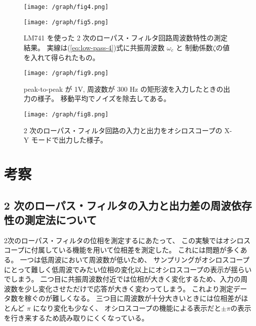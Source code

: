 \documentclass[11pt,dvipdfmx,a4paper]{jsarticle}
\begin{document}
\begin{figure}[H]
	\centering
	\begin{minipage}[t]{0.49\columnwidth}
		\centering
		\texttt{[image: /graph/fig4.png]}
		\label{graph:no4}
	\end{minipage}
	\hfill
	\begin{minipage}[t]{0.49\columnwidth}
		\centering
		\texttt{[image: /graph/fig5.png]}
		\label{graph:no5}
	\end{minipage}
	\caption{LM741 を使った 2 次のローパス・フィルタ回路周波数特性の測定結果。
	実線は(\ref{eq:low-pass-4})式に共振周波数 \(\omega_c\) と 制動係数\(\zeta\)の値を入れて得られたもの。}
\end{figure}

\begin{figure}[H]
	\centering
	\begin{minipage}[t]{0.55\columnwidth}
		\centering
		\texttt{[image: /graph/fig9.png]}
		\caption{peak-to-peak が 1V, 周波数が 300 Hz の矩形波を入力したときの出力の様子。
		移動平均でノイズを除去してある。}
		\label{graph:no9}
	\end{minipage}
	\hfill
	\begin{minipage}[t]{0.42\columnwidth}
		\centering
		\texttt{[image: /graph/fig8.png]}
		\caption{2 次のローパス・フィルタ回路の入力と出力をオシロスコープの X-Y モードで出力した様子。}
		\label{graph:no8}
	\end{minipage}
\end{figure}

\section{考察}
\subsection{2 次のローパス・フィルタの入力と出力差の周波依存性の測定法について}
2次のローパス・フィルタの位相を測定するにあたって、
この実験ではオシロスコープに付属している機能を用いて位相差を測定した。
これには問題が多くある。
一つは低周波において周波数が低いため、
サンプリングがオシロスコープにとって難しく低周波でみたい位相の変化以上にオシロスコープの表示が揺らいでしまう。
二つ目に共振周波数付近では位相が大きく変化するため、入力の周波数を少し変化させただけで応答が大きく変わってしまう。
これより測定データ数を稼ぐのが難しくなる。
三つ目に周波数が十分大きいときには位相差がほとんど \(\pi\) になり変化も少なく、
オシロスコープの機能による表示だと\(\pm\pi\)の表示を行き来するため読み取りにくくなっている。
\end{document}
